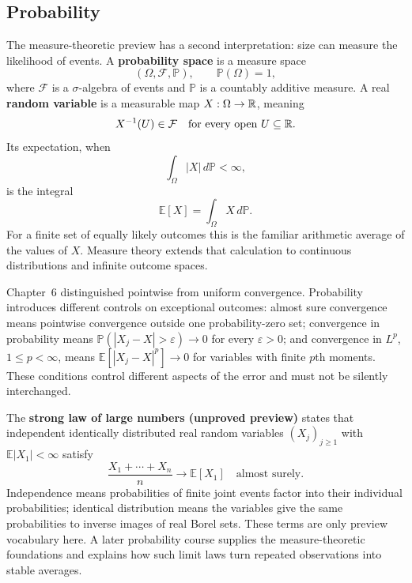 \subsection*{Probability}

The measure-theoretic preview has a second interpretation: size can measure
the likelihood of events. A \textbf{probability space} is a measure space
\[
(\Omega,\mathcal F,\mathbb P),\qquad \mathbb P(\Omega)=1,
\]
where $\mathcal F$ is a $\sigma$-algebra of events and $\mathbb P$ is
a countably additive measure. A real \textbf{random variable} is a measurable
map $X:\Omega\to\mathbb{R}$, meaning
\[
X^{-1}(U)\in\mathcal F\quad\text{for every open }U\subseteq\mathbb{R}.
\]
Its expectation, when
\[
\int_\Omega|X|\,d\mathbb P<\infty,
\]
 is the integral
\[
\boxed{\mathbb E[X]=\int_\Omega X\,d\mathbb P.}
\]
For a finite set of equally likely outcomes this is the familiar arithmetic
average of the values of $X$. Measure theory extends that calculation to
continuous distributions and infinite outcome spaces.

Chapter~6 distinguished pointwise from uniform convergence. Probability
introduces different controls on exceptional outcomes: almost sure
convergence means pointwise convergence outside one probability-zero set;
convergence in probability means
$\mathbb P(|X_j-X|>\varepsilon)\to0$ for every $\varepsilon>0$;
and convergence in $L^p$, $1\leq p<\infty$, means
$\mathbb E[|X_j-X|^p]\to0$ for variables with finite $p$th moments.
These conditions control different aspects of the error and must not be
silently interchanged.

The \textbf{strong law of large numbers (unproved preview)} states that
independent identically distributed real random variables $(X_j)_{j\geq1}$
with $\mathbb E|X_1|<\infty$ satisfy
\[
\boxed{\frac{X_1+\cdots+X_n}{n}\longrightarrow\mathbb E[X_1]
\quad\text{almost surely}.}
\]
Independence means probabilities of finite joint events factor into their
individual probabilities; identical distribution means the variables give
the same probabilities to inverse images of real Borel sets. These terms
are only preview vocabulary here. A later probability course supplies
the measure-theoretic foundations and explains how such limit laws turn
repeated observations into stable averages.
